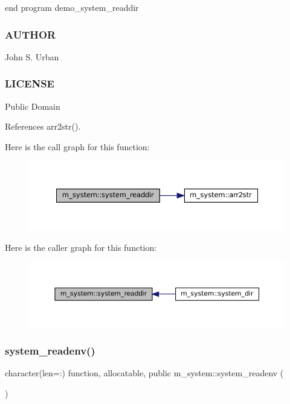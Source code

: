 end program demo\+\_\+system\+\_\+readdir

\subsubsection*{A\+U\+T\+H\+OR}

John S. Urban \subsubsection*{L\+I\+C\+E\+N\+SE}

Public Domain 

References arr2str().

Here is the call graph for this function\+:\nopagebreak
\begin{figure}[H]
\begin{center}
\leavevmode
\includegraphics[width=350pt]{namespacem__system_a983df5b2d7cb5842d69c4a31829403e0_cgraph}
\end{center}
\end{figure}
Here is the caller graph for this function\+:\nopagebreak
\begin{figure}[H]
\begin{center}
\leavevmode
\includegraphics[width=350pt]{namespacem__system_a983df5b2d7cb5842d69c4a31829403e0_icgraph}
\end{center}
\end{figure}
\mbox{\label{namespacem__system_ae0e43010a82a6a25402568ccb326322d}} 
\subsubsection{\texorpdfstring{system\+\_\+readenv()}{system\_readenv()}}
{\footnotesize\ttfamily character(len=\+:) function, allocatable, public m\+\_\+system\+::system\+\_\+readenv (\begin{DoxyParamCaption}{ }\end{DoxyParamCaption})}




